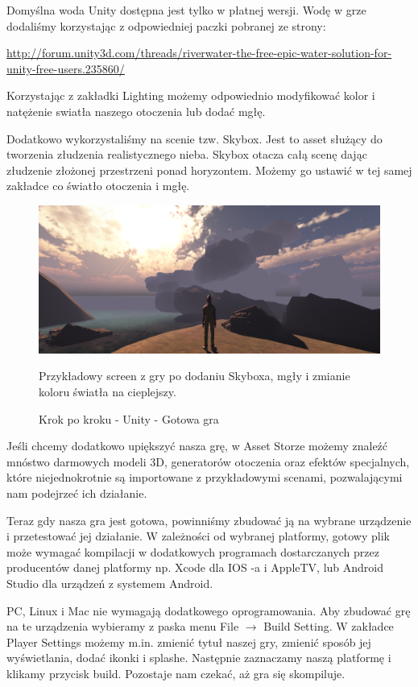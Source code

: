 \documentclass[brudnopis]{xmgr}
\begin{document}
Domyślna woda Unity dostępna jest tylko w płatnej wersji. Wodę w grze dodaliśmy korzystając z odpowiedniej paczki pobranej ze strony:

\url{http://forum.unity3d.com/threads/riverwater-the-free-epic-water-solution-for-unity-free-users.235860/}

Korzystając z zakładki Lighting możemy odpowiednio modyfikować kolor i natężenie swiatła naszego otoczenia lub dodać mgłę.

Dodatkowo wykorzystaliśmy na scenie tzw. Skybox. Jest to asset służący do tworzenia złudzenia realistycznego nieba. Skybox otacza całą scenę dając złudzenie złożonej przestrzeni ponad horyzontem. Możemy go ustawić w tej samej zakładce co światło otoczenia i mgłę.

\begin{figure}[!htb]
    \begin{center}
    \includegraphics[scale=0.25]{Screeny/UnityKrokPoKroku/gotowa_gra.png}
    \end{center}
    \caption{Krok po kroku - Unity - Gotowa gra}
Przykładowy screen z gry po dodaniu Skyboxa, mgły i zmianie koloru światła na cieplejszy.
\end{figure}

Jeśli chcemy dodatkowo upiększyć nasza grę, w Asset Storze możemy znaleźć mnóstwo darmowych modeli 3D, generatorów otoczenia oraz efektów specjalnych, które niejednokrotnie są importowane z przykładowymi scenami, pozwalającymi nam podejrzeć ich działanie.

Teraz gdy nasza gra jest gotowa, powinniśmy zbudować ją na wybrane urządzenie i przetestować jej działanie. W zależności od wybranej platformy, gotowy plik może wymagać kompilacji w dodatkowych programach dostarczanych przez producentów danej platformy np. Xcode dla IOS -a i AppleTV, lub Android Studio dla urządzeń z systemem Android. 

PC, Linux i Mac nie wymagają dodatkowego oprogramowania. Aby zbudować grę na te urządzenia wybieramy z paska menu File $\rightarrow$ Build Setting. W zakładce Player Settings możemy m.in. zmienić tytuł naszej gry, zmienić sposób jej wyświetlania, dodać ikonki i splashe. Następnie zaznaczamy naszą platformę i klikamy przycisk build. Pozostaje nam czekać, aż gra się skompiluje.
\end{document}
